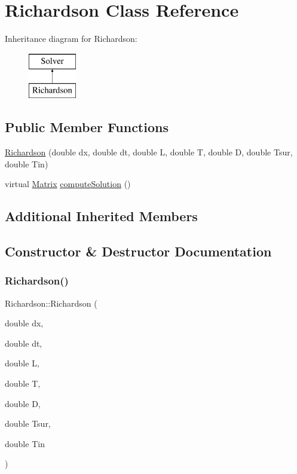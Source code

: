 \hypertarget{classRichardson}{}\section{Richardson Class Reference}
\label{classRichardson}
Inheritance diagram for Richardson\+:\begin{figure}[H]
\begin{center}
\leavevmode
\includegraphics[height=2.000000cm]{classRichardson}
\end{center}
\end{figure}
\subsection*{Public Member Functions}
\begin{DoxyCompactItemize}
\item 
\mbox{\hyperlink{classRichardson_a43802f7613bfd6074da2c823a6bbbb2c}{Richardson}} (double dx, double dt, double L, double T, double D, double Tsur, double Tin)
\item 
virtual \mbox{\hyperlink{classMatrix}{Matrix}} \mbox{\hyperlink{classRichardson_a8d2471f20a6b433cf7ccf5a4817b14a3}{compute\+Solution}} ()
\end{DoxyCompactItemize}
\subsection*{Additional Inherited Members}


\subsection{Constructor \& Destructor Documentation}
\mbox{\label{classRichardson_a43802f7613bfd6074da2c823a6bbbb2c}} 
\subsubsection{\texorpdfstring{Richardson()}{Richardson()}}
{\footnotesize\ttfamily Richardson\+::\+Richardson (\begin{DoxyParamCaption}\item[{double}]{dx,  }\item[{double}]{dt,  }\item[{double}]{L,  }\item[{double}]{T,  }\item[{double}]{D,  }\item[{double}]{Tsur,  }\item[{double}]{Tin }\end{DoxyParamCaption})}

